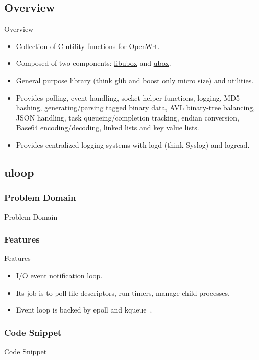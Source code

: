 \subsection{Overview}
\begin{frame}{Overview}
    \begin{itemize}[<+-|alert@+>]
        \item Collection of C utility functions for OpenWrt.
        \item Composed of two components: \href{https://git.openwrt.org/project/libubox.git}{libubox} and \href{https://git.openwrt.org/project/ubox.git}{ubox}.
        \item General purpose library (think \href{https://wiki.gnome.org/Projects/GLib}{glib} and \href{https://www.boost.org/}{boost} only micro size) and utilities.
        \item Provides polling, event handling, socket helper functions, logging, MD5 hashing, generating/parsing tagged binary data, AVL binary-tree balancing, JSON handling, task queueing/completion tracking, endian conversion, Base64 encoding/decoding, linked lists and key value lists.
        \item Provides centralized logging systems with logd (think Syslog) and logread.
    \end{itemize}
\end{frame}

\subsection{uloop}

\subsubsection{Problem Domain}
\begin{frame}{Problem Domain}
\end{frame}

\subsubsection{Features}
\begin{frame}{Features}
    \begin{itemize}[<+-|alert@+>]
        \item I/O event notification loop.
        \item Its job is to poll file descriptors, run timers, manage child processes.
        \item Event loop is backed by epoll and kqueue~\cite{starch-linux-programming-interface}.
    \end{itemize}
\end{frame}

\subsubsection{Code Snippet}
\begin{frame}{Code Snippet}
    
\end{frame}
